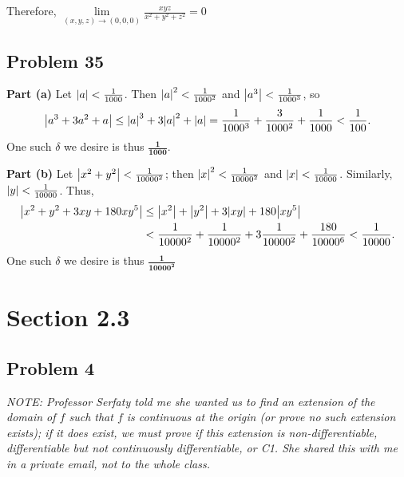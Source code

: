 \documentclass[11pt]{article}
\begin{document}
Therefore, $\lim\limits_{(x, y, z) \to (0, 0, 0)} \frac{xyz}{x^{2} + y^{2} + z^{2}}= 0$


\subsection{Problem 35}

\textbf{Part (a)} Let $\abs{a} < \tfrac{1}{1000}$. Then $\abs{a}^{2} < \tfrac{1}{1000^{2}}$ and $\abs{a^{3}} < \tfrac{1}{1000^{3}}$, so
\[
	\abs{a^{3} + 3a^{2} + a} \le \abs{a}^{3} + 3 \abs{a}^{2} + \abs{a} = \frac{1}{1000^{3}} + \frac{3}{1000^{2}} + \frac{1}{1000} < \frac{1}{100}.
\]
One such $\delta$ we desire is thus $\mathbf{\tfrac{1}{1000}}$.

\textbf{Part (b)} Let $\abs{x^{2} + y^{2}} < \tfrac{1}{10000^{2}}$; then $\abs{x}^{2} < \tfrac{1}{10000^{2}}$ and $\abs{x} < \tfrac{1}{10000}$. Similarly, $\abs{y} < \tfrac{1}{10000}$. Thus,
\begin{align*}
	\abs{x^{2} + y^{2} + 3xy + 180xy^{5}} &\le \abs{x^{2}} + \abs{y^{2}} + 3 \abs{xy} + 180 \abs{xy^{5}} \\
	&< \frac{1}{10000^{2}} + \frac{1}{10000^{2}} + 3 \frac{1}{10000^{2}} + \frac{180}{10000^{6}} < \frac{1}{10000}.
\end{align*}
One such $\delta$ we desire is thus $\mathbf{\tfrac{1}{10000^{2}}}$


\section{Section 2.3}


\subsection{Problem 4}

\textit{NOTE: Professor Serfaty told me she wanted us to find an extension of the domain of $f$ such that $f$ is continuous at the origin (or prove no such extension exists); if it does exist, we must prove if this extension is non-differentiable, differentiable but not continuously differentiable, or C1. She shared this with me in a private email, not to the whole class.}

\end{document}
